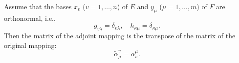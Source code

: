 Assume that the bases $x_v$ ($v = 1, \dots, n$) of $E$ and $y_\mu$ ($\mu = 1, \dots, m$) of $F$ are orthonormal, i.e.,
$$g_{v\lambda} = \delta_{v\lambda}, \quad h_{\kappa\mu} = \delta_{\kappa\mu}.$$
Then the matrix of the adjoint mapping is the transpose of the matrix of the original mapping:
$$\tilde{\alpha}_\mu^v = \alpha_v^\mu.$$

